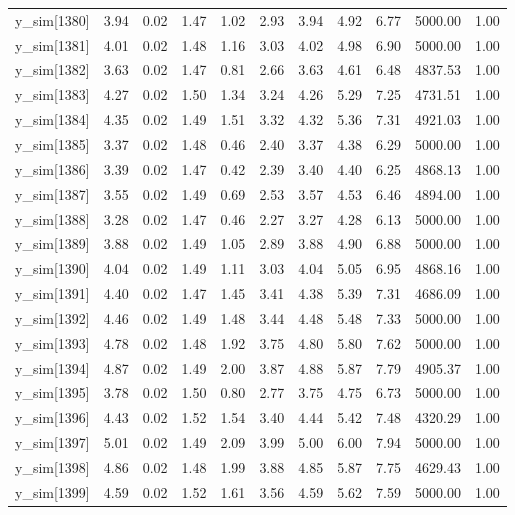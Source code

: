 \begin{table}[ht]
\begin{tabular}{rrrrrrrrrrr}
  y\_sim[1380] & 3.94 & 0.02 & 1.47 & 1.02 & 2.93 & 3.94 & 4.92 & 6.77 & 5000.00 & 1.00 \\ 
  y\_sim[1381] & 4.01 & 0.02 & 1.48 & 1.16 & 3.03 & 4.02 & 4.98 & 6.90 & 5000.00 & 1.00 \\ 
  y\_sim[1382] & 3.63 & 0.02 & 1.47 & 0.81 & 2.66 & 3.63 & 4.61 & 6.48 & 4837.53 & 1.00 \\ 
  y\_sim[1383] & 4.27 & 0.02 & 1.50 & 1.34 & 3.24 & 4.26 & 5.29 & 7.25 & 4731.51 & 1.00 \\ 
  y\_sim[1384] & 4.35 & 0.02 & 1.49 & 1.51 & 3.32 & 4.32 & 5.36 & 7.31 & 4921.03 & 1.00 \\ 
  y\_sim[1385] & 3.37 & 0.02 & 1.48 & 0.46 & 2.40 & 3.37 & 4.38 & 6.29 & 5000.00 & 1.00 \\ 
  y\_sim[1386] & 3.39 & 0.02 & 1.47 & 0.42 & 2.39 & 3.40 & 4.40 & 6.25 & 4868.13 & 1.00 \\ 
  y\_sim[1387] & 3.55 & 0.02 & 1.49 & 0.69 & 2.53 & 3.57 & 4.53 & 6.46 & 4894.00 & 1.00 \\ 
  y\_sim[1388] & 3.28 & 0.02 & 1.47 & 0.46 & 2.27 & 3.27 & 4.28 & 6.13 & 5000.00 & 1.00 \\ 
  y\_sim[1389] & 3.88 & 0.02 & 1.49 & 1.05 & 2.89 & 3.88 & 4.90 & 6.88 & 5000.00 & 1.00 \\ 
  y\_sim[1390] & 4.04 & 0.02 & 1.49 & 1.11 & 3.03 & 4.04 & 5.05 & 6.95 & 4868.16 & 1.00 \\ 
  y\_sim[1391] & 4.40 & 0.02 & 1.47 & 1.45 & 3.41 & 4.38 & 5.39 & 7.31 & 4686.09 & 1.00 \\ 
  y\_sim[1392] & 4.46 & 0.02 & 1.49 & 1.48 & 3.44 & 4.48 & 5.48 & 7.33 & 5000.00 & 1.00 \\ 
  y\_sim[1393] & 4.78 & 0.02 & 1.48 & 1.92 & 3.75 & 4.80 & 5.80 & 7.62 & 5000.00 & 1.00 \\ 
  y\_sim[1394] & 4.87 & 0.02 & 1.49 & 2.00 & 3.87 & 4.88 & 5.87 & 7.79 & 4905.37 & 1.00 \\ 
  y\_sim[1395] & 3.78 & 0.02 & 1.50 & 0.80 & 2.77 & 3.75 & 4.75 & 6.73 & 5000.00 & 1.00 \\ 
  y\_sim[1396] & 4.43 & 0.02 & 1.52 & 1.54 & 3.40 & 4.44 & 5.42 & 7.48 & 4320.29 & 1.00 \\ 
  y\_sim[1397] & 5.01 & 0.02 & 1.49 & 2.09 & 3.99 & 5.00 & 6.00 & 7.94 & 5000.00 & 1.00 \\ 
  y\_sim[1398] & 4.86 & 0.02 & 1.48 & 1.99 & 3.88 & 4.85 & 5.87 & 7.75 & 4629.43 & 1.00 \\ 
  y\_sim[1399] & 4.59 & 0.02 & 1.52 & 1.61 & 3.56 & 4.59 & 5.62 & 7.59 & 5000.00 & 1.00 \\ 

\end{tabular}
\end{table}
